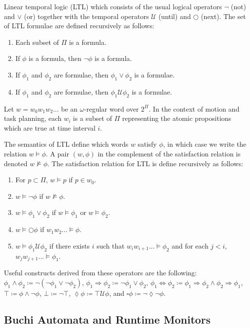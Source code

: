 \documentclass{llncs}
\begin{document}
Linear temporal logic (LTL) which consists of the usual logical operators $\neg$ (not) and $\vee$ (or) together with the temporal operators $\mathcal{U}$ (until) and $\bigcirc$ (next).
%
The set of LTL formulae are defined recursively as follows:
\begin{enumerate}
	\item Each subset of $\Pi$ is a formula.
	\item If $\phi$ is a formula, then $\neg\phi$ is a formula.
	\item If $\phi_1$ and $\phi_2$ are formulae, then $\phi_1 \vee \phi_2$ is a formulae.
	\item If $\phi_1$ and $\phi_2$ are formulae, then $\phi_1 \mathcal{U} \phi_2$ is a formulae.
\end{enumerate}
Let $w=w_0w_1w_2...$ be an $\omega$-regular word over $2^{\Pi}$. 
%
In the context of motion and task planning, each $w_i$ is a subset of $\Pi$ representing the atomic propositions which are true at time interval $i$.
%

The semantics of LTL define which words $w$ satisfy $\phi$, in which case we write the relation $w \models \phi$. 
%
A pair $(w,\phi)$ in the complement of the satisfaction relation is denoted $w\not\models\phi$.
%
The satisfaction relation for LTL is define recursively as follows:
\begin{enumerate}
	\item For $p\subset \Pi$,  $w\models p$ if $p \in w_0$.
	\item $w\models \neg\phi$ if $w \not\models \phi$.
	\item $w\models \phi_1 \vee \phi_2$ if $w\models\phi_1$ or $w\models\phi_2$.
	\item $w\models \bigcirc\phi$ if $w_1w_2... \models \phi$.
	\item $w\models \phi_1 \mathcal{U} \phi_2$ if there exists $i$ such that $w_iw_{i+1}...\models\phi_2$ and for each $j<i$, $w_jw_{j+1}...\models\phi_1$.
\end{enumerate}
%
Useful constructs derived from these operators are the following: $\phi_1 \wedge \phi_2 \coloneqq \neg(\neg \phi_1 \vee \neg \phi_2)$, $\phi_1 \Rightarrow \phi_2 \coloneqq \neg \phi_1 \vee \phi_2$, $\phi_1 \Leftrightarrow \phi_2 \coloneqq \phi_1 \Rightarrow \phi_2 \wedge \phi_2 \Rightarrow \phi_1$, $\top \coloneqq \phi \wedge \neg \phi$, $\bot \coloneqq \neg \top$, $\lozenge \phi \coloneqq \top \mathcal{U} \phi$, and $\square \phi \coloneqq \neg \lozenge\neg \phi$.
%

\subsection{Buchi Automata and Runtime Monitors}
\end{document}
